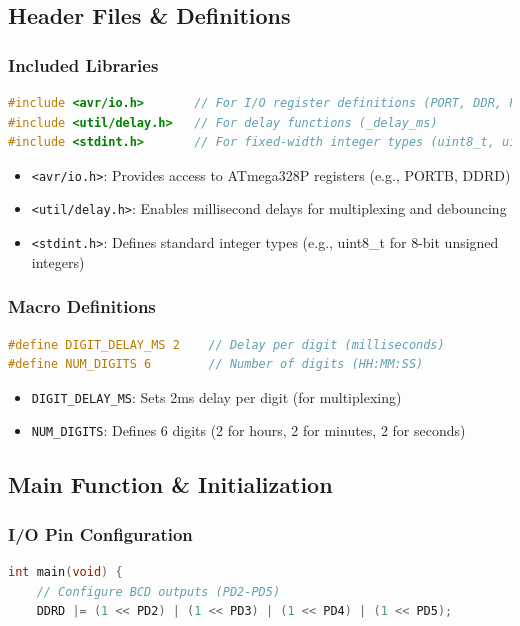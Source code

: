 \documentclass{article}
\begin{document}
\subsection{Header Files \& Definitions}
\subsubsection{Included Libraries}
\begin{lstlisting}[language=C]
#include <avr/io.h>       // For I/O register definitions (PORT, DDR, PIN)
#include <util/delay.h>   // For delay functions (_delay_ms)
#include <stdint.h>       // For fixed-width integer types (uint8_t, uint16_t)
\end{lstlisting}

\begin{itemize}
\item \texttt{<avr/io.h>}: Provides access to ATmega328P registers (e.g., PORTB, DDRD)
\item \texttt{<util/delay.h>}: Enables millisecond delays for multiplexing and debouncing
\item \texttt{<stdint.h>}: Defines standard integer types (e.g., uint8\_t for 8-bit unsigned integers)
\end{itemize}

\subsubsection{Macro Definitions}
\begin{lstlisting}[language=C]
#define DIGIT_DELAY_MS 2    // Delay per digit (milliseconds)
#define NUM_DIGITS 6        // Number of digits (HH:MM:SS)
\end{lstlisting}

\begin{itemize}
\item \texttt{DIGIT\_DELAY\_MS}: Sets 2ms delay per digit (for multiplexing)
\item \texttt{NUM\_DIGITS}: Defines 6 digits (2 for hours, 2 for minutes, 2 for seconds)
\end{itemize}

\subsection{Main Function \& Initialization}
\subsubsection{I/O Pin Configuration}
\begin{lstlisting}[language=C]
int main(void) {
    // Configure BCD outputs (PD2-PD5)
    DDRD |= (1 << PD2) | (1 << PD3) | (1 << PD4) | (1 << PD5);
\end{lstlisting}
\end{document}
